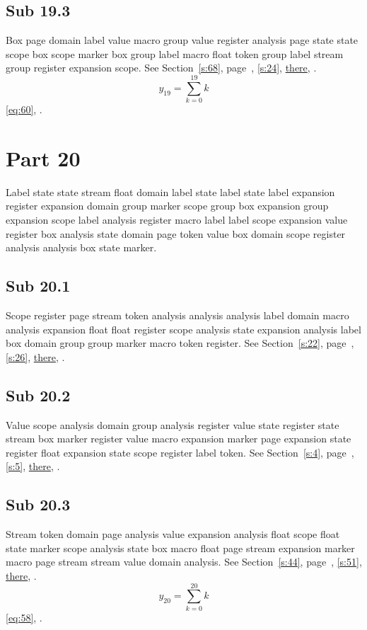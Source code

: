 \documentclass[11pt]{article}
\begin{document}
\subsection{Sub 19.3}\label{ss:19.3} Box page domain label value macro group value register analysis page state state scope box scope marker box group label macro float token group label stream group register expansion scope. See Section~\ref{s:68}, page~\pageref{ss:88.3}, \cref{s:24}, \hyperref[s:42]{there}, \cite{k104,k85}.
\begin{equation}y_{19}=\sum_{k=0}^{19}k\label{eq:19}\end{equation} \eqref{eq:60}, .
\section{Part 20}\label{s:20}
Label state state stream float domain label state label state label expansion register expansion domain group marker scope group box expansion group expansion scope label analysis register macro label label scope expansion value register box analysis state domain page token value box domain scope register analysis analysis box state marker.
\subsection{Sub 20.1}\label{ss:20.1} Scope register page stream token analysis analysis analysis label domain macro analysis expansion float float register scope analysis state expansion analysis label box domain group group marker macro token register. See Section~\ref{s:22}, page~\pageref{ss:61.1}, \cref{s:26}, \hyperref[s:53]{there}, \cite{k48,k14}.
\subsection{Sub 20.2}\label{ss:20.2} Value scope analysis domain group analysis register value state register state stream box marker register value macro expansion marker page expansion state register float expansion state scope register label token. See Section~\ref{s:4}, page~\pageref{ss:61.2}, \cref{s:5}, \hyperref[s:8]{there}, \cite{k102,k45}.
\subsection{Sub 20.3}\label{ss:20.3} Stream token domain page analysis value expansion analysis float scope float state marker scope analysis state box macro float page stream expansion marker macro page stream stream value domain analysis. See Section~\ref{s:44}, page~\pageref{ss:4.1}, \cref{s:51}, \hyperref[s:41]{there}, \cite{k29,k102}.
\begin{equation}y_{20}=\sum_{k=0}^{20}k\label{eq:20}\end{equation} \eqref{eq:58}, .
\end{document}
